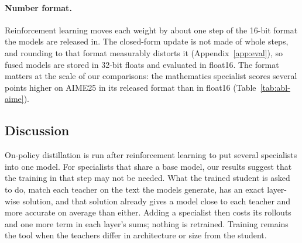 \paragraph{Number format.}\label{sec:exp-precision} Reinforcement learning
moves each weight by about one step of the 16-bit format the models are
released in. The closed-form update is not made of whole steps, and rounding
to that format measurably distorts it (Appendix~\ref{app:eval}), so fused
models are stored in 32-bit floats and evaluated in float16. The format
matters at the scale of our comparisons: the mathematics specialist scores
several points higher on AIME25 in its released format than in float16
(Table~\ref{tab:abl-aime}).

\subsection{Discussion}
\label{sec:discussion}

On-policy distillation is run after reinforcement learning to put several
specialists into one model. For specialists that share a base model, our
results suggest that the training in that step may not be needed. What the
trained student is asked to do, match each teacher on the text the models
generate, has an exact layer-wise solution, and that solution already gives a
model close to each teacher and more accurate on average than either. Adding
a specialist then costs its rollouts and one more term in each layer's sums;
nothing is retrained. Training remains the tool when the teachers differ in
architecture or size from the student.
